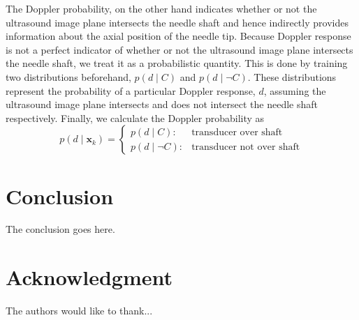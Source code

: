 \documentclass[journal,transmag]{IEEEtran}
\newcommand{\bvar}[2]{\mathbf{#1}_{#2}}
\begin{document}
The Doppler probability, on the other hand indicates whether or not the ultrasound image plane intersects the needle shaft and hence indirectly provides information about the axial position of the needle tip.  Because Doppler response is not a perfect indicator of whether or not the ultrasound image plane intersects the needle shaft, we treat it as a probabilistic quantity.  This is done by training two distributions beforehand, $p(d \mid C)$ and $p(d \mid \neg C)$.  These distributions represent the probability of a particular Doppler response, $d$, assuming the ultrasound image plane intersects and does not intersect the needle shaft respectively.  Finally, we calculate the Doppler probability as 
\begin{equation*}
p(d \mid \bvar{x}{k}) = \left\{ \begin{array}{lr} p(d \mid C) : & \text{transducer over shaft} \\ p(d \mid \neg C) : &\text{transducer not over shaft} \end{array} \right.
\end{equation*}
\section{Conclusion}
The conclusion goes here.


\section*{Acknowledgment}
The authors would like to thank...




%
%
%
 

\end{document}
